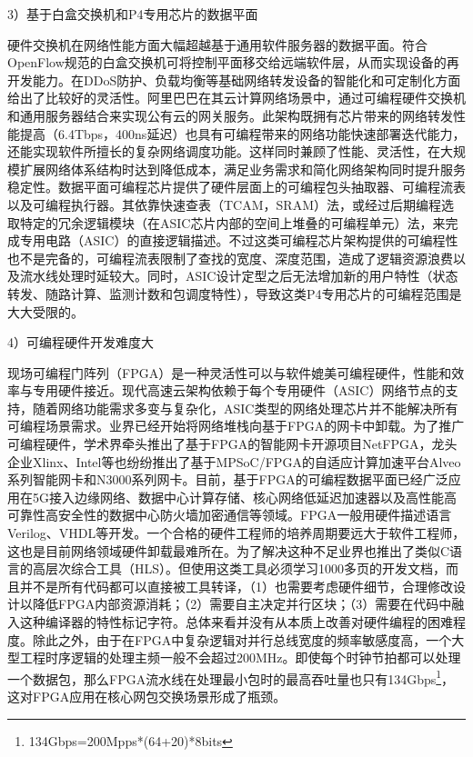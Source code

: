 3）基于白盒交换机和P4专用芯片的数据平面

硬件交换机在网络性能方面大幅超越基于通用软件服务器的数据平面。符合OpenFlow规范的白盒交换机可将控制平面移交给远端软件层，从而实现设备的再开发能力。在DDoS防护、负载均衡等基础网络转发设备的智能化和可定制化方面给出了比较好的灵活性。阿里巴巴在其云计算网络场景中，通过可编程硬件交换机和通用服务器结合来实现公有云的网关服务。此架构既拥有芯片带来的网络转发性能提高（6.4Tbps，400ns延迟）也具有可编程带来的网络功能快速部署迭代能力，还能实现软件所擅长的复杂网络调度功能。这样同时兼顾了性能、灵活性，在大规模扩展网络体系结构时达到降低成本，满足业务需求和简化网络架构同时提升服务稳定性。数据平面可编程芯片提供了硬件层面上的可编程包头抽取器、可编程流表以及可编程执行器。其依靠快速查表（TCAM，SRAM）法，或经过后期编程选取特定的冗余逻辑模块（在ASIC芯片内部的空间上堆叠的可编程单元）法，来完成专用电路（ASIC）的直接逻辑描述。不过这类可编程芯片架构提供的可编程性也不是完备的，可编程流表限制了查找的宽度、深度范围，造成了逻辑资源浪费以及流水线处理时延较大。同时，ASIC设计定型之后无法增加新的用户特性（状态转发、随路计算、监测计数和包调度特性），导致这类P4专用芯片的可编程范围是大大受限的。

4）可编程硬件开发难度大

现场可编程门阵列（FPGA）是一种灵活性可以与软件媲美可编程硬件，性能和效率与专用硬件接近。现代高速云架构依赖于每个专用硬件（ASIC）网络节点的支持，随着网络功能需求多变与复杂化，ASIC类型的网络处理芯片并不能解决所有可编程场景需求。业界已经开始将网络堆栈向基于FPGA的网卡中卸载。为了推广可编程硬件，学术界牵头推出了基于FPGA的智能网卡开源项目NetFPGA，龙头企业Xlinx、Intel等也纷纷推出了基于MPSoC/FPGA的自适应计算加速平台Alveo系列智能网卡和N3000系列网卡。目前，基于FPGA的可编程数据平面已经广泛应用在5G接入边缘网络、数据中心计算存储、核心网络低延迟加速器以及高性能高可靠性高安全性的数据中心防火墙加密通信等领域。FPGA一般用硬件描述语言Verilog、VHDL等开发。一个合格的硬件工程师的培养周期要远大于软件工程师，这也是目前网络领域硬件卸载最难所在。为了解决这种不足业界也推出了类似C语言的高层次综合工具（HLS）。但使用这类工具必须学习1000多页的开发文档，而且并不是所有代码都可以直接被工具转译，（1）也需要考虑硬件细节，合理修改设计以降低FPGA内部资源消耗；（2）需要自主决定并行区块；（3）需要在代码中融入这种编译器的特性标记字符。总体来看并没有从本质上改善对硬件编程的困难程度。除此之外，由于在FPGA中复杂逻辑对并行总线宽度的频率敏感度高，一个大型工程时序逻辑的处理主频一般不会超过200MHz。即使每个时钟节拍都可以处理一个数据包，那么FPGA流水线在处理最小包时的最高吞吐量也只有134Gbps\footnote{134Gbps=200Mpps*(64+20)*8bits}，这对FPGA应用在核心网包交换场景形成了瓶颈。



